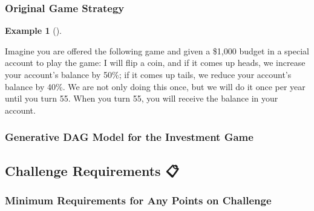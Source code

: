 \documentclass[
  letterpaper,
  DIV=11,
  numbers=noendperiod]{scrartcl}
\theoremstyle{definition}
\newtheorem{example}{Example}[section]
\theoremstyle{remark}
\begin{document}
\subsubsection{Original Game Strategy}\label{original-game-strategy}

\begin{example}[]\protect\hypertarget{exm-ErgodicityEconomicsExample}{}\label{exm-ErgodicityEconomicsExample}

Imagine you are offered the following game and given a \$1,000 budget in
a special account to play the game: I will flip a coin, and if it comes
up heads, we increase your account's balance by 50\%; if it comes up
tails, we reduce your account's balance by 40\%. We are not only doing
this once, but we will do it once per year until you turn 55. When you
turn 55, you will receive the balance in your account.

\end{example}

\subsubsection{Generative DAG Model for the Investment
Game}\label{generative-dag-model-for-the-investment-game}

\subsection{Challenge Requirements 📋}\label{challenge-requirements}

\subsubsection{Minimum Requirements for Any Points on
Challenge}\label{minimum-requirements-for-any-points-on-challenge}
\end{document}

